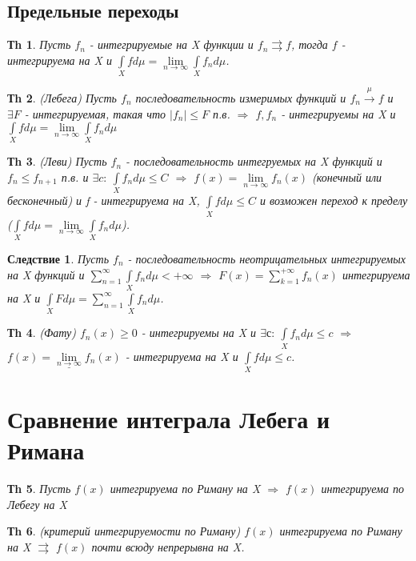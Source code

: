 \documentclass[14pt]{article}
\theoremstyle{plain}
\newtheorem{Thm}{Тh}
\newtheorem{Sled}{Следствие}
\theoremstyle{definition}
\begin{document}
		\subsection{Предельные переходы}
			\begin{Thm}
				Пусть $f_n$ - интегрируемые на X функции и $f_n \rightrightarrows f$, тогда $f$ - интегрируема на X и $\int\limits_X f d\mu = \lim\limits_{n \to \infty} \int\limits_X f_n d\mu$. 
			\end{Thm}
			\begin{Thm}
				(Лебега)\newline
				Пусть $f_n$ последовательность измеримых функций и $f_n \xrightarrow{\mu} f$ и $\exists F$ - интегрируемая, такая что $|f_n| \leq F$ п.в. $\Rightarrow$ $f, f_n$ - интегрируемы на X и $\int\limits_X f d\mu = \lim\limits_{n \to \infty} \int\limits_X f_n d\mu$
			\end{Thm}
			\begin{Thm}
				(Леви)\newline
				Пусть $f_n$ - последовательность интегруемых на X функций и $f_n \leq f_{n+1}$ п.в. и $\exists c: \ \int\limits_X f_n d\mu \leq C$ $\Rightarrow$ $f(x) = \lim\limits_{n\to\infty} f_n(x)$  (конечный или бесконечный) и f - интегрируема на X, $\int\limits_X f d\mu \leq C$ и возможен переход к пределу ($\int\limits_X f d\mu = \lim\limits_{n \to \infty} \int\limits_X f_n d\mu$).
			\end{Thm}
			\begin{Sled}
				Пусть $f_n$ - последовательность неотрицательных интегрируемых на X функций и $\sum\limits_{n=1}^{\infty} \int\limits_X f_n d\mu < + \infty$ $\Rightarrow$ $F(x) = \sum\limits_{k=1}^{+\infty} f_n(x)$ интегрируема на X и $\int\limits_X F d\mu = \sum\limits_{n=1}^{\infty} \int\limits_X f_n d\mu$.
			\end{Sled}
			\begin{Thm}
				(Фату)
				$f_n(x) \geq 0$ - интегрируемы на X и $\exists с:\ \int\limits_X f_n d\mu \leq c$ $\Rightarrow$ $f(x) = \underline{\lim\limits_{n\to\infty} }f_n(x)$  - интегрируема на X и $\int\limits_X f d\mu \leq c$. 
			\end{Thm}
	\section{Сравнение интеграла Лебега и Римана}
		\begin{Thm}
			Пусть $f(x)$ интегрируема по Риману на X $\Rightarrow$ $f(x)$ интегрируема по Лебегу на X
		\end{Thm}
		\begin{Thm}
			(критерий интегрируемости по Риману)\newline
			$f(x)$ интегрируема по Риману на X $\rightrightarrows$ $f(x)$ почти всюду непрерывна на X.
		\end{Thm}
\end{document}
